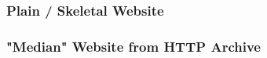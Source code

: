 






\subsubsection{Plain / Skeletal Website}


    



\subsubsection{"Median" Website from HTTP Archive}






